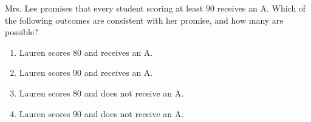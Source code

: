 Mrs. Lee promises that every student scoring at least $90$ receives an A. Which of the following outcomes are consistent with her promise, and how many are possible?
\begin{enumerate}\item Lauren scores $80$ and receives an A.\item Lauren scores $90$ and receives an A.\item Lauren scores $80$ and does not receive an A.\item Lauren scores $90$ and does not receive an A.\end{enumerate}
